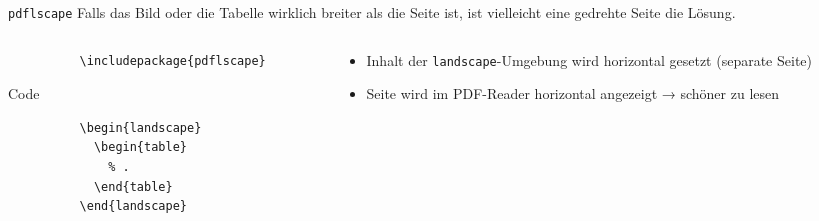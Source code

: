 \begin{frame}[fragile]{\texttt{pdflscape}}
  Falls das Bild oder die Tabelle wirklich breiter als die Seite ist, ist vielleicht eine gedrehte Seite die Lösung.
  \begin{columns}[onlytextwidth, t]
    \begin{column}{0.50\textwidth}
      \begin{Packages}
        \begin{lstlisting}
          \includepackage{pdflscape}
        \end{lstlisting}
      \end{Packages}
      \begin{block}{Code}
        \begin{lstlisting}
          \begin{landscape}
            \begin{table}
              % .
            \end{table}
          \end{landscape}
        \end{lstlisting}
      \end{block}
    \end{column}
    \begin{column}{0.46\textwidth}
      \begin{itemize}
        \item Inhalt der \texttt{landscape}-Umgebung wird horizontal gesetzt (separate Seite)
        \item Seite wird im PDF-Reader horizontal angezeigt → schöner zu lesen
      \end{itemize}
    \end{column}
  \end{columns}
\end{frame}

